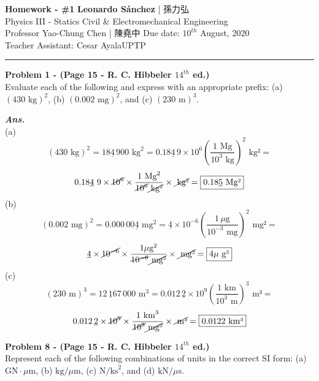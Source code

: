 \documentclass[letterpaper, 11pt]{article}
\newenvironment{problem}[2][Problem]
    { \begin{mdframed} \textbf{#1 #2} \\}
    {  \end{mdframed}}
\newenvironment{solution}
    {\textbf{\textit{Ans.}}\\}
    { }
\begin{document}
\noindent
\large\textbf{Homework - \#1} \hfill \textbf{Leonardo Sánchez} |  孫\text{ }力弘   \\
Physics III - Statics \hfill Civil \& Electromechanical Engineering \\
Professor Yao-Chung Chen | 陳\text{ }堯中 \hfill Due date: $10^{th}$ August, 2020\\
Teacher Assistant: Cesar Ayala\hfill UPTP \\
\noindent\rule{7.5in}{2.8pt}
\begin{problem}{1 - (Page 15 - R. C. Hibbeler $14^{th}$ ed.)}
    Evaluate each of the following and express with an appropriate prefix:
     (a) $(430 \text{ kg})^2$, (b) $(0.002\text{ mg})^2$, and
    (c) $(230\text{ m})^3$.
\end{problem}
\begin{solution}
(a)
    \[(430\text{ kg})^2=18\underline{4}\, 900\text{ kg}^2 = 0.18\underline{4}\, 9\times 10^6 \left(\frac{1 \text{ Mg}}{10^3 \text{ kg}}\right)^2 \text{ kg²}=\]
    \[0.18\underline{4}\,\, 9\times \cancel{10^6} \times \frac{1 \text{ Mg}^2}{\cancel{10^6} \cancel{\text{ kg²}}}\times \cancel{\text{ kg²}}=\boxed{0.18\underline{5}\text{ Mg²}}\]
\end{solution}
(b)
    \[(0.002\text{ mg})^2=0.000\,00\underline{4}\text{ mg}^2 = \underline{4}\times 10^{-6} \left(\frac{1 \,\mu\text{g}}{10^{-3} \text{ mg}}\right)^2 \text{ mg²}=\]
    \[\underline{4}\times \cancel{10^{-6}} \times \frac{1 \mu \text{g}^2}{\cancel{10^{-6}} \cancel{\text{ mg²}}}\times \cancel{\text{ mg²}}=\boxed{4\mu\text{ g²}}\]
(c)
    \[(230 \text{ m})^3=12\,\underline{1}67\,000\text{ m}^3 =0.012\,\underline{2}\times 10^{9} \left(\frac{1 \text{ km}}{10^{3} \text{ m}}\right)^3 \text{ m³}=\]
    \[0.012\,\underline{2}\times \cancel{10^{9}} \times \frac{1 \text{ km}^3}{\cancel{10^{9}} \cancel{\text{ mg²}}}\times \cancel{\text{ m³}}=\boxed{0.0122\text{ km³}}\]
\begin{problem}{8 - (Page 15 - R. C. Hibbeler $14^{th}$ ed.)}
    Represent each of the following combinations of units
    in the correct SI form: (a) $\text{GN} \cdot \mu \text{m}$, (b) $\text{kg}/\mu \text{m}$, (c) $\text{N/ks}^2$,
    and (d) $\text{kN}/\mu \text{s}$.
\end{problem}
\end{document}
